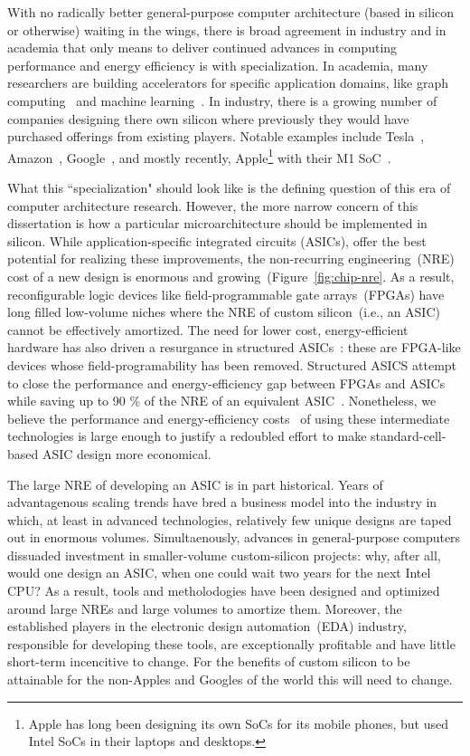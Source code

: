 With no radically better general-purpose computer architecture (based in
silicon or otherwise) waiting in the wings, there is broad agreement in
industry and in academia that only means to deliver continued advances in
computing performance and energy efficiency is with specialization. In
academia, many researchers are building accelerators
for specific application domains, like graph computing~\cite{Graphicionado}
and machine learning~\cite{Eyeriss}. In industry, there is a growing number of
companies designing there own silicon where previously they would have
purchased offerings from existing players. Notable
examples include Tesla~\cite{FSDChip}, Amazon~\cite{Graviton},
Google~\cite{TPU}, and mostly recently, Apple\footnote{Apple has long been
designing its own SoCs for its mobile phones, but used Intel SoCs in their laptops and desktops.} with their M1
SoC~\cite{AppleM1}.

What this ``specialization" should look like is the defining question
of this era of computer architecture research. However, the more narrow concern of
this dissertation is how a particular microarchitecture should be implemented in silicon.  While
application-specific integrated circuits (ASICs), offer the best potential for
realizing these improvements, the non-recurring engineering~(NRE) cost of a new
design is enormous and growing~(Figure~\ref{fig:chip-nre}. As a result, reconfigurable logic devices like
field-programmable gate arrays~(FPGAs) have long filled low-volume niches where
the NRE of custom silicon~(i.e., an ASIC) cannot be effectively amortized. The need for
lower cost, energy-efficient hardware has also driven a resurgance in
structured ASICs~\cite{SAHARA}: these are FPGA-like devices whose
field-programability has been removed. Structured ASICS attempt to close the performance and
energy-efficiency gap between FPGAs and ASICs while saving up to 90 \% of the
NRE of an equivalent ASIC~\cite{StructuredASIC}.  Nonetheless, we believe the
performance and energy-efficiency costs~\cite{FPGAGap2} of using these
intermediate technologies is large enough to justify a redoubled effort to make
standard-cell-based ASIC design more economical.

The large NRE of developing an ASIC is in part historical.  Years of
advantagenous scaling trends have bred a business model into the industry in
which, at least in advanced technologies, relatively few unique designs are
taped out in enormous volumes. Simultaenously, advances in general-purpose computers dissuaded
investment in smaller-volume custom-silicon projects: why, after all, would one
design an ASIC, when one could wait two years for the next Intel CPU?
As a result, tools and metholodogies have been designed and optimized around
large NREs and large volumes to amortize them. Moreover, the established
players in the electronic design automation~(EDA) industry, responsible for
developing these tools, are exceptionally profitable and have little short-term
incencitive to change. For the benefits of custom silicon to be attainable for
the non-Apples and Googles of the world this will need to change.

